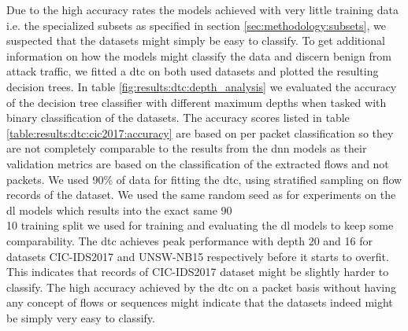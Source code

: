 Due to the high accuracy rates the models achieved with very little training data i.e. the specialized subsets as specified in section \ref{sec:methodology:subsets}, we suspected that the datasets might simply be easy to classify. To get additional information on how the models might classify the data and discern benign from attack traffic, we fitted a \gls{dtc} on both used datasets and plotted the resulting decision trees. In table \ref{fig:results:dtc:depth_analysis} we evaluated the accuracy of the decision tree classifier with different maximum depths when tasked with binary classification of the datasets. 
The accuracy scores listed in table \ref{table:results:dtc:cic2017:accuracy} are based on per packet classification so they are not completely comparable to the results from the \gls{dnn} models as their validation metrics are based on the classification of the extracted flows and not packets. 
We used 90\% of data for fitting the \gls{dtc}, using stratified sampling on flow records of the dataset. 
We used the same random seed as for experiments on the \gls{dl} models which results into the exact same 90\\10 training split we used for training and evaluating the \gls{dl} models to keep some comparability. The \gls{dtc} achieves peak performance with depth 20 and 16 for datasets CIC-IDS2017 and UNSW-NB15 respectively before it starts to overfit. 
This indicates that records of CIC-IDS2017 dataset might be slightly harder to classify.
The high accuracy achieved by the \gls{dtc} on a packet basis without having any concept of flows or sequences might indicate that the datasets indeed might be simply very easy to classify. 

